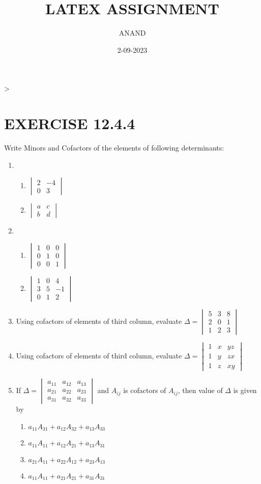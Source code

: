 \documentclass{article}
\theoremstyle{remark}
\begin{document}
\title{LATEX ASSIGNMENT}
\author{ANAND}
\date{2-09-2023}
\maketitle                                                                       >
\section*{EXERCISE 12.4.4}
Write Minors and Cofactors of the elements of following determinants:
\begin{enumerate}
\item
\begin{enumerate}[label=(\roman*)]
\item $\begin{vmatrix} 2&-4\\ 0&3\end{vmatrix}$
\item $\begin{vmatrix} a&c\\b&d\end{vmatrix}$
\end{enumerate}
\item
\begin{enumerate}[label=(\roman*)]
\item $\begin{vmatrix} 1&0&0\\ 0&1&0 \\ 0&0&1\end{vmatrix}$
\item $\begin{vmatrix} 1&0&4\\ 3&5&-1 \\ 0&1&2\end{vmatrix}$
\end{enumerate}
\item Using cofactors of elements of third column, evaluate $\Delta= \begin{vmatrix} 5&3&8\\ 2&0&1\\ 1&2&3\end{vmatrix}$
\item Using cofactors of elements of third column, evaluate $\Delta= \begin{vmatrix} 1&x&yz\\ 1&y&zx\\ 1&z&xy\end{vmatrix}$
\item If $\Delta= \begin{vmatrix} a_{11}&a_{12}&a_{13}\\ a_{21}&a_{22}&a_{23}\\ a_{31}&a_{32}&a_{33}\end{vmatrix}$ and $A_{ij}$ is cofactors of $A_{ij}$, then value of $\Delta$ is given by
\begin{enumerate}[label=(\roman*)]
\item $a_{11} A_{31}+a_{12} A_{32}+a_{13} A_{33}$
\item $a_{11} A_{11}+a_{12} A_{21}+a_{13} A_{31}$
\item $a_{21} A_{11}+a_{22} A_{12}+a_{23} A_{13}$
\item $a_{11} A_{11}+a_{21} A_{21}+a_{31} A_{31}$
\end{enumerate}
\end{enumerate}
\end{document}

